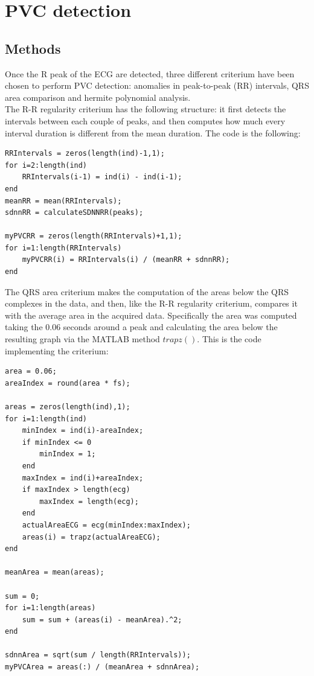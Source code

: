 \documentclass[a4paper,titlepage]{article}
\begin{document}
\section{PVC detection}
\subsection{Methods}
Once the R peak of the ECG are detected, three different criterium have been chosen to perform PVC detection: anomalies in peak-to-peak (RR) intervals, QRS area comparison and hermite polynomial analysis.\\
The R-R regularity criterium has the following structure: it first detects the intervals between each couple of peaks, and then computes how much every interval duration is different from the mean duration. The code is the following:
\begin{lstlisting}[caption=RR criterium]
% RR regularity
RRIntervals = zeros(length(ind)-1,1);
for i=2:length(ind)
    RRIntervals(i-1) = ind(i) - ind(i-1);
end
meanRR = mean(RRIntervals);
sdnnRR = calculateSDNNRR(peaks);

myPVCRR = zeros(length(RRIntervals)+1,1);
for i=1:length(RRIntervals)
	myPVCRR(i) = RRIntervals(i) / (meanRR + sdnnRR);
end
\end{lstlisting}

The QRS area criterium makes the computation of the areas below the QRS complexes in the data, and then, like the R-R regularity criterium, compares it with the average area in the acquired data. Specifically the area was computed taking the 0.06 seconds around a peak and calculating the area below the resulting graph via the MATLAB method $trapz()$. This is the code implementing the criterium:
\begin{lstlisting}[caption=QRS area criterium]
% QRS area
area = 0.06;
areaIndex = round(area * fs);

areas = zeros(length(ind),1);
for i=1:length(ind)
    minIndex = ind(i)-areaIndex;
    if minIndex <= 0
        minIndex = 1;
    end
    maxIndex = ind(i)+areaIndex;
    if maxIndex > length(ecg)
        maxIndex = length(ecg);
    end
    actualAreaECG = ecg(minIndex:maxIndex);
    areas(i) = trapz(actualAreaECG);
end

meanArea = mean(areas);

sum = 0;
for i=1:length(areas)
    sum = sum + (areas(i) - meanArea).^2;
end

sdnnArea = sqrt(sum / length(RRIntervals));
myPVCArea = areas(:) / (meanArea + sdnnArea);
\end{lstlisting}
\end{document}

